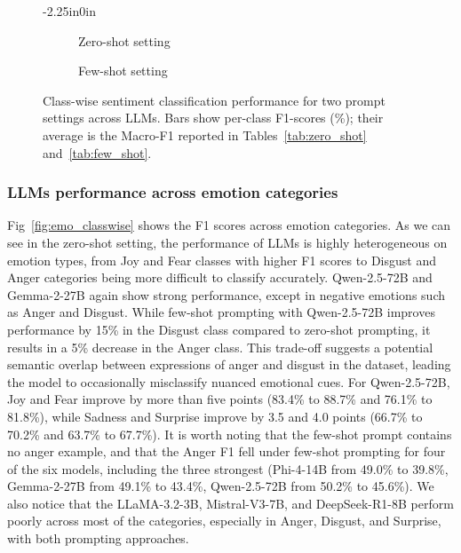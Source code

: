 \documentclass[10pt,letterpaper]{article}
\begin{document}
\begin{figure}[t]
\begin{adjustwidth}{-2.25in}{0in}
  \centering
  \captionsetup[sub]{font=small}

  \begin{subfigure}{0.7\textwidth}
    \centering
    \caption{Zero-shot setting}
    \label{fig:sentiment_zero}
  \end{subfigure}
  \hfill
  \begin{subfigure}{0.7\textwidth}
    \centering
    \caption{Few-shot setting}
    \label{fig:sentiment_few}
  \end{subfigure}

  \caption{Class-wise sentiment classification performance for two prompt settings across LLMs. Bars show per-class F1-scores (\%); their average is the Macro-F1 reported in Tables~\ref{tab:zero_shot} and~\ref{tab:few_shot}.}
  \label{fig:sentiment_classes}
\end{adjustwidth}
\end{figure}


\subsubsection*{LLMs performance across emotion categories}

Fig~\ref{fig:emo_classwise} shows the F1 scores across emotion categories. As we can see in the zero-shot setting, the performance of LLMs is highly heterogeneous on emotion types, from Joy and Fear classes with higher F1 scores to Disgust and Anger categories being more difficult to classify accurately. Qwen-2.5-72B and Gemma-2-27B again show strong performance, except in negative emotions such as Anger and Disgust. While few-shot prompting with Qwen-2.5-72B improves performance by 15\% in the Disgust class compared to zero-shot prompting, it results in a 5\% decrease in the Anger class. This trade-off suggests a potential semantic overlap between expressions of anger and disgust in the dataset, leading the model to occasionally misclassify nuanced emotional cues. For Qwen-2.5-72B, Joy and Fear improve by more than five points (83.4\% to 88.7\% and 76.1\% to 81.8\%), while Sadness and Surprise improve by 3.5 and 4.0 points (66.7\% to 70.2\% and 63.7\% to 67.7\%). It is worth noting that the few-shot prompt contains no anger example, and that the Anger F1 fell under few-shot prompting for four of the six models, including the three strongest (Phi-4-14B from 49.0\% to 39.8\%, Gemma-2-27B from 49.1\% to 43.4\%, Qwen-2.5-72B from 50.2\% to 45.6\%). We also notice that the LLaMA-3.2-3B, Mistral-V3-7B, and DeepSeek-R1-8B perform poorly across most of the categories, especially in Anger, Disgust, and Surprise, with both prompting approaches.
\end{document}
